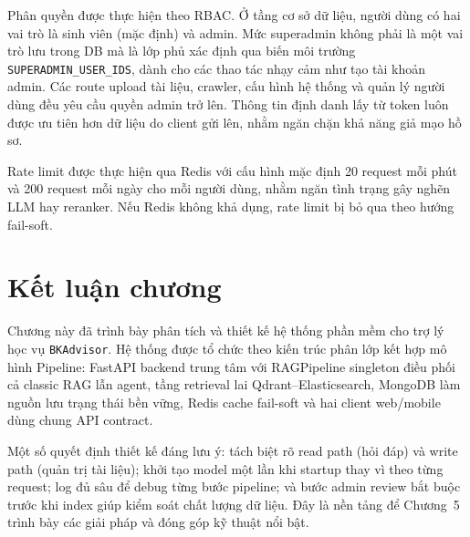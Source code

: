 \documentclass[../DoAn.tex]{subfiles}
\begin{document}
Phân quyền được thực hiện theo RBAC. Ở tầng cơ sở dữ liệu, người dùng có hai vai
trò là sinh viên (mặc định) và admin. Mức superadmin không phải là một vai trò
lưu trong DB mà là lớp phủ xác định qua biến môi trường
\texttt{SUPERADMIN\_USER\_IDS}, dành cho các thao tác nhạy cảm như tạo tài khoản
admin. Các route upload tài liệu, crawler, cấu hình hệ thống và quản lý người
dùng đều yêu cầu quyền admin trở lên. Thông tin định danh lấy từ token luôn được
ưu tiên hơn dữ liệu do client gửi lên, nhằm ngăn chặn khả năng giả mạo hồ sơ.

Rate limit được thực hiện qua Redis với cấu hình mặc định 20 request mỗi phút
và 200 request mỗi ngày cho mỗi người dùng, nhằm ngăn tình trạng gây nghẽn
LLM hay reranker. Nếu Redis không khả dụng, rate limit bị bỏ qua theo hướng
fail-soft.

\section{Kết luận chương}

Chương này đã trình bày phân tích và thiết kế hệ thống phần mềm cho trợ lý
học vụ \texttt{BKAdvisor}. Hệ thống được tổ chức theo kiến trúc phân lớp kết hợp
mô hình Pipeline: FastAPI backend trung tâm với RAGPipeline singleton điều phối
cả classic RAG lẫn agent, tầng retrieval lai Qdrant--Elasticsearch, MongoDB làm
nguồn lưu trạng thái bền vững, Redis cache fail-soft và hai client web/mobile
dùng chung API contract.

Một số quyết định thiết kế đáng lưu ý: tách biệt rõ read path (hỏi đáp) và
write path (quản trị tài liệu); khởi tạo model một lần khi startup thay vì
theo từng request; log đủ sâu để debug từng bước pipeline; và bước admin review
bắt buộc trước khi index giúp kiểm soát chất lượng dữ liệu. Đây là nền tảng
để Chương~5 trình bày các giải pháp và đóng góp kỹ thuật nổi bật.
\end{document}
